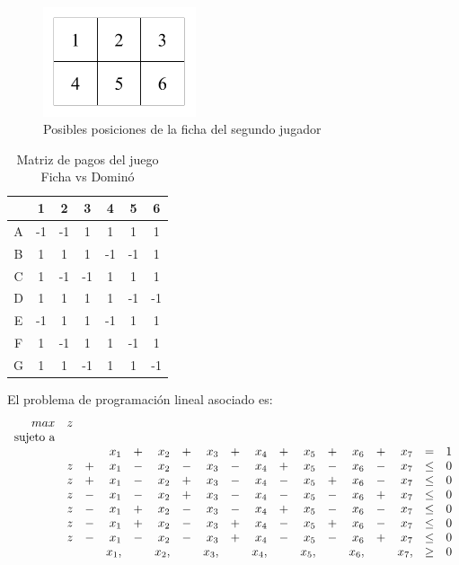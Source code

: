 \begin{figure}[hbt]
\caption{Posibles posiciones de la ficha del segundo jugador}
\label{fig:posiciones}
\centering
\includegraphics[width=0.4\textwidth]{figuras/posiciones.png}
\end{figure}

\begin{table}[hbt]
\begin{center}
\caption{Matriz de pagos del juego Ficha vs Dominó}
\label{table:pagos-domino}
\begin{tabular}{ c | c | c | c | c | c | c |}
  &  1 &  2 &  3 &  4 &  5 &  6 \\ \hline
A & -1 & -1 &  1 &  1 &  1 &  1 \\ \hline
B &  1 &  1 &  1 & -1 & -1 &  1 \\ \hline
C &  1 & -1 & -1 &  1 &  1 &  1 \\ \hline
D &  1 &  1 &  1 &  1 & -1 & -1 \\ \hline
E & -1 &  1 &  1 & -1 &  1 &  1 \\ \hline
F &  1 & -1 &  1 &  1 & -1 &  1 \\ \hline
G &  1 &  1 & -1 &  1 &  1 & -1 \\ \hline
\end{tabular}
\end{center}
\end{table}

El problema de programación lineal asociado es:
\begin{equation}
\begin{array}{r r r r r r r r r r r r r r r r r r}
max        &z& &   & &   & &   & &   & &   & &   & &   &      & \\
\text{sujeto a} \\  
	& & &x_1&+&x_2&+&x_3&+&x_4&+&x_5&+&x_6&+&x_7& =    &1 \\
    &z&+&x_1&-&x_2&-&x_3&-&x_4&+&x_5&-&x_6&-&x_7& \leq &0 \\
    &z&+&x_1&-&x_2&+&x_3&-&x_4&-&x_5&+&x_6&-&x_7& \leq &0 \\
    &z&-&x_1&-&x_2&+&x_3&-&x_4&-&x_5&-&x_6&+&x_7& \leq &0 \\
    &z&-&x_1&+&x_2&-&x_3&-&x_4&+&x_5&-&x_6&-&x_7& \leq &0 \\
    &z&-&x_1&+&x_2&-&x_3&+&x_4&-&x_5&+&x_6&-&x_7& \leq &0 \\
    &z&-&x_1&-&x_2&-&x_3&+&x_4&-&x_5&-&x_6&+&x_7& \leq &0 \\
    & & &x_1,&&x_2,&&x_3,&&x_4,&&x_5,&&x_6,&&x_7,&\geq &0 \\
\end{array}
\end{equation}

